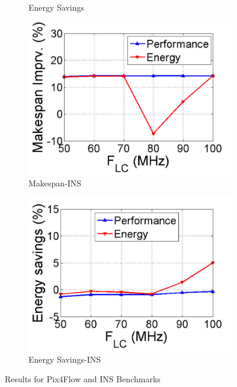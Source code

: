 \begin{figure}[!tp]
\begin{subfigure}{.5\columnwidth}
		\caption{Energy Savings}
		\label{fig:flow_energy}
	\end{subfigure}
	\begin{subfigure}{.5\columnwidth}
		\centering
		\includegraphics[width=\columnwidth]{./figures/openshoe_makespan}
		\caption{Makespan-INS}
		\label{fig:openshoe_makespan}
	\end{subfigure}
	\begin{subfigure}{.5\columnwidth}
		\centering
		\includegraphics[width=\columnwidth]{./figures/openshoe_energy}
		\caption{Energy Savings-INS}
		\label{fig:openshoe_energy}
	\end{subfigure}
	\caption{Results for Pix4Flow and INS Benchmarks}
	\label{fig:Flc80-delta}
\end{figure}

